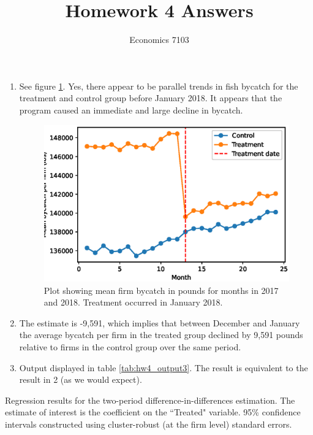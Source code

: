 \documentclass{article}
\title{Homework 4 Answers}
\author{Economics 7103}
\begin{document}
  
\maketitle

\begin{enumerate}
\item See figure \ref{fig:hw4_q1}.  Yes, there appear to be parallel trends in fish bycatch for the treatment and control group before January 2018.  It appears that the program caused an immediate and large decline in bycatch.
\begin{figure}[h]
    \centering
    \includegraphics[scale = 0.7]{hw4_q1.eps}
    \caption{Plot showing mean firm bycatch in pounds for months in 2017 and 2018.  Treatment occurred in January 2018.}
    \label{fig:hw4_q1}
\end{figure}
\item The estimate is -9,591, which implies that between December and January the average bycatch per firm in the treated group declined by 9,591 pounds relative to firms in the control group over the same period.
\item Output displayed in table \ref{tab:hw4_output3}.  The result is equivalent to the result in 2 (as we would expect).
\end{enumerate}

\begin{table}[h]
    \centering
    
    \caption{Regression results for the two-period difference-in-differences estimation.  The estimate of interest is the coefficient on the ``Treated" variable. 95\% confidence intervals constructed using cluster-robust (at the firm level) standard errors.}
    \label{tab:hw4_output3}
\end{table}
\end{document}
